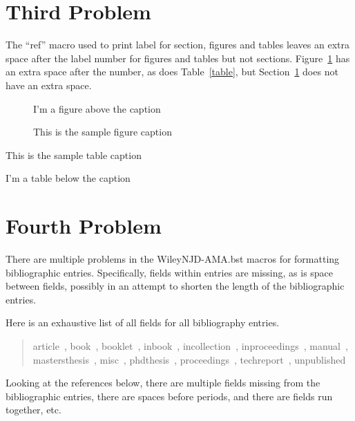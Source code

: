 \documentclass[AMA,STIX1COL]{WileyNJD-v2}
\begin{document}
\section{Third Problem}\label{section}

The ``ref'' macro used to print label for section, figures and tables leaves an extra space after the label number for figures and tables but not sections.
Figure~\ref{figure} has an extra space after the number, as does Table~\ref{table}, but Section~\ref{section} does not have an extra space.

\begin{figure}
\centering
I'm a figure above the caption
\caption{This is the sample figure caption}
\label{figure}
\end{figure}

\begin{table}
\caption{This is the sample table caption}
\label{table}
\centering
I'm a table below the caption
\end{table}


\section{Fourth Problem}

There are multiple problems in the WileyNJD-AMA.bst macros for formatting bibliographic entries.
Specifically, fields within entries are missing, as is space between fields, possibly in an attempt to shorten the length of the bibliographic entries.

Here is an exhaustive list of all fields for all bibliography entries.
\begin{quote}
article~\cite{article01}, book~\cite{book01}, booklet~\cite{booklet01}, inbook~\cite{inbook01}, incollection~\cite{incollection01}, inproceedings~\cite{inproceedings01}, manual~\cite{manual01}, mastersthesis~\cite{mastersthesis01}, misc~\cite{misc01}, phdthesis~\cite{phdthesis01}, proceedings~\cite{proceedings01}, techreport~\cite{techreport01}, unpublished~\cite{unpublished01}
\end{quote}
Looking at the references below, there are multiple fields missing from the bibliographic entries, there are spaces before periods, and there are fields run together, etc.

\nocite{*}%
%
\end{document}
